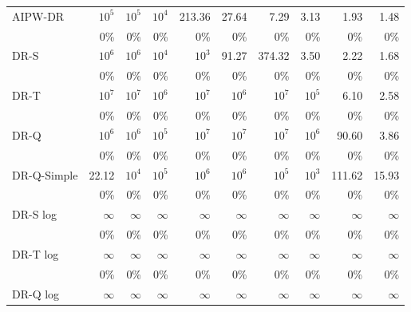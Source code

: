 \documentclass{article}
\begin{document}
\begin{table}[H]
\begin{tabular}{l|rrrrrrrrr}
AIPW-DR & $10^{5}$ & $10^{5}$ & $10^{4}$ & 213.36 & 27.64 & 7.29 & 3.13 & 1.93 & 1.48 \\
 & \scriptsize 0\% & \scriptsize 0\% & \scriptsize 0\% & \scriptsize 0\% & \scriptsize 0\% & \scriptsize 0\% & \scriptsize 0\% & \scriptsize 0\% & \scriptsize 0\% \\[2pt]
\hline
DR-S & $10^{6}$ & $10^{6}$ & $10^{4}$ & $10^{3}$ & 91.27 & 374.32 & 3.50 & 2.22 & 1.68 \\
 & \scriptsize 0\% & \scriptsize 0\% & \scriptsize 0\% & \scriptsize 0\% & \scriptsize 0\% & \scriptsize 0\% & \scriptsize 0\% & \scriptsize 0\% & \scriptsize 0\% \\[2pt]
DR-T & $10^{7}$ & $10^{7}$ & $10^{6}$ & $10^{7}$ & $10^{6}$ & $10^{7}$ & $10^{5}$ & 6.10 & 2.58 \\
 & \scriptsize 0\% & \scriptsize 0\% & \scriptsize 0\% & \scriptsize 0\% & \scriptsize 0\% & \scriptsize 0\% & \scriptsize 0\% & \scriptsize 0\% & \scriptsize 0\% \\[2pt]
DR-Q & $10^{6}$ & $10^{6}$ & $10^{5}$ & $10^{7}$ & $10^{7}$ & $10^{7}$ & $10^{6}$ & 90.60 & 3.86 \\
 & \scriptsize 0\% & \scriptsize 0\% & \scriptsize 0\% & \scriptsize 0\% & \scriptsize 0\% & \scriptsize 0\% & \scriptsize 0\% & \scriptsize 0\% & \scriptsize 0\% \\[2pt]
DR-Q-Simple & 22.12 & $10^{4}$ & $10^{5}$ & $10^{6}$ & $10^{6}$ & $10^{5}$ & $10^{3}$ & 111.62 & 15.93 \\
 & \scriptsize 0\% & \scriptsize 0\% & \scriptsize 0\% & \scriptsize 0\% & \scriptsize 0\% & \scriptsize 0\% & \scriptsize 0\% & \scriptsize 0\% & \scriptsize 0\% \\[2pt]
\hline
DR-S log & $\infty$ & $\infty$ & $\infty$ & $\infty$ & $\infty$ & $\infty$ & $\infty$ & $\infty$ & $\infty$ \\
 & \scriptsize 0\% & \scriptsize 0\% & \scriptsize 0\% & \scriptsize 0\% & \scriptsize 0\% & \scriptsize 0\% & \scriptsize 0\% & \scriptsize 0\% & \scriptsize 0\% \\[2pt]
DR-T log & $\infty$ & $\infty$ & $\infty$ & $\infty$ & $\infty$ & $\infty$ & $\infty$ & $\infty$ & $\infty$ \\
 & \scriptsize 0\% & \scriptsize 0\% & \scriptsize 0\% & \scriptsize 0\% & \scriptsize 0\% & \scriptsize 0\% & \scriptsize 0\% & \scriptsize 0\% & \scriptsize 0\% \\[2pt]
DR-Q log & $\infty$ & $\infty$ & $\infty$ & $\infty$ & $\infty$ & $\infty$ & $\infty$ & $\infty$ & $\infty$ \\

\end{tabular}
\end{table}
\end{document}
